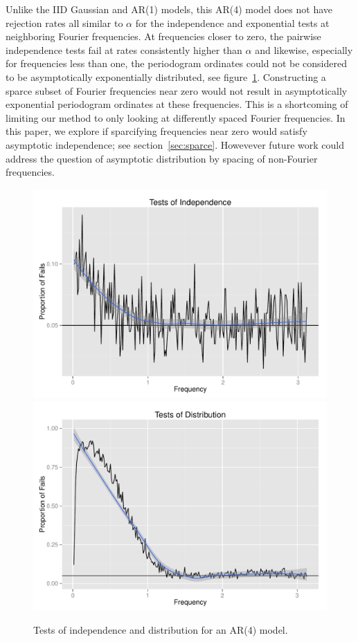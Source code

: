 \documentclass{article}\usepackage[]{graphicx}\usepackage[]{color}
\newenvironment{knitrout}{}{} %
\theoremstyle{plain}
\begin{document}
Unlike the IID Gaussian and AR(1) models, this AR(4) model does not have rejection rates all similar to $\alpha$ for the independence and exponential tests at neighboring Fourier frequencies. At frequencies closer to zero, the pairwise independence tests fail at rates consistently higher than $\alpha$ and likewise, especially for frequencies less than one, the periodogram ordinates could not be considered to be asymptotically exponentially distributed, see figure~\ref{fig:tests-ar4}. Constructing a sparce subset of Fourier frequencies near zero would not result in asymptotically exponential periodogram ordinates at these frequencies. This is a shortcoming of limiting our method to only looking at differently spaced Fourier frequencies. In this paper, we explore if sparcifying frequencies near zero would satisfy asymptotic independence; see section~\ref{sec:sparce}. Howevever future work could address the question of asymptotic distribution by spacing of non-Fourier frequencies.

\begin{knitrout}
\color{fgcolor}\begin{figure}[h]

\includegraphics[width=.49\textwidth]{figure/tests-ar41} 
\includegraphics[width=.49\textwidth]{figure/tests-ar42} \caption[Tests of independence and distribution for an AR(4) model]{Tests of independence and distribution for an AR(4) model.\label{fig:tests-ar4}}
\end{figure}


\end{knitrout}
\end{document}
